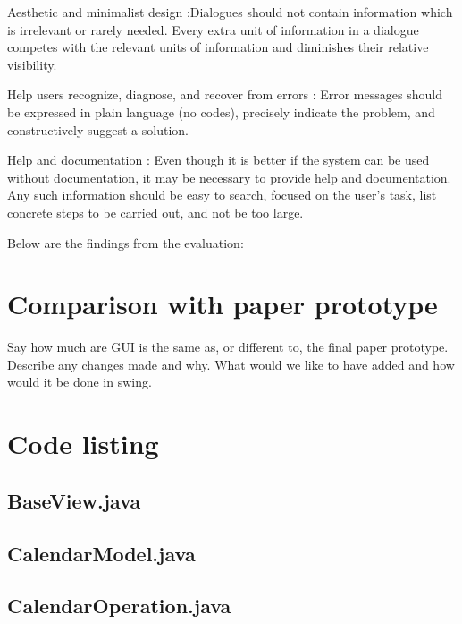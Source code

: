 \documentclass{article}
\begin{document}
\item Aesthetic and minimalist design :Dialogues should not contain information which is irrelevant or rarely needed. Every extra unit of information in a dialogue competes with the relevant units of information and diminishes their relative visibility. 
    
\item Help users recognize, diagnose, and recover from errors : Error messages should be expressed in plain language (no codes), precisely indicate the problem, and constructively suggest a solution. 
    
\item Help and documentation : Even though it is better if the system can be used without documentation, it may be necessary to provide help and documentation. Any such information should be easy to search, focused on the user's task, list concrete steps to be carried out, and not be too large.    


Below are the findings from the evaluation:








\section{Comparison with paper prototype}

Say how much are GUI is the same as, or different to, the final paper
prototype. Describe any changes made and why. What would we like to have
added and how would it be done in swing.

\appendix

\section{Code listing}

\subsection{BaseView.java}



\subsection{CalendarModel.java}



\subsection{CalendarOperation.java}
\end{document}
